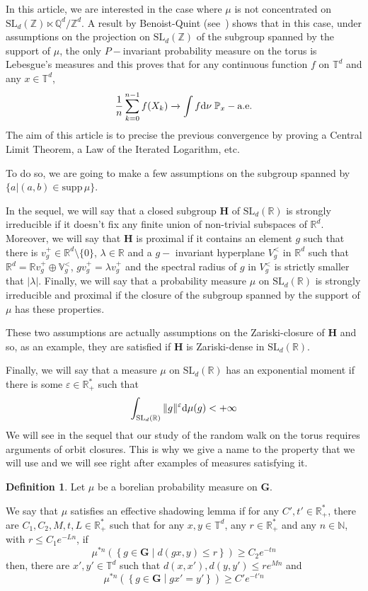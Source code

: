 \documentclass[11pt]{amsart}
\theoremstyle{definition}
\newtheorem{definition}[theorem]{Definition}
\theoremstyle{remark}
\numberwithin{equation}{section}
\begin{document}
\medskip
In this article, we are interested in the case where $\mu$ is not concentrated on $\mathrm{SL}_d({\mathbb Z})\ltimes {\mathbb Q}^d/{\mathbb Z}^d$. A result by Benoist-Quint (see~\cite{BQStat0}) shows that in this case, under assumptions on the projection on $\mathrm{SL}_d({\mathbb Z})$ of the subgroup spanned by the support of $\mu$, the only $P-$invariant probability measure on the torus is Lebesgue's measures and this proves that for any continuous function $f$ on ${\mathbb T}^d$ and any $x\in {\mathbb T}^d$,
\[
\frac 1 n \sum_{k=0}^{n-1} f(X_k) \xrightarrow\, \int f{{\rm d}}\nu \;{\mathbb P}_x-\text{a.e.}
\]
The aim of this article is to precise the previous convergence by proving a Central Limit Theorem, a Law of the Iterated Logarithm, etc.

To do so, we are going to make a few assumptions on the subgroup spanned by $\{a|(a,b)\in{\mathrm{supp}\,}\mu\}$.

In the sequel, we will say that a closed subgroup ${\mathbf H}$ of $\mathrm{SL}_d({\mathbb R})$ is strongly irreducible if it doesn't fix any finite union of non-trivial subspaces of ${\mathbb R}^d$. Moreover, we will say that ${\mathbf H}$ is proximal if it contains an element $g$ such that there is $v_g^+ \in {\mathbb R}^d\setminus\{0\}$, $\lambda \in {\mathbb R}$ and a $g-$
invariant hyperplane $V_g^<$ in ${\mathbb R}^d$ such that ${\mathbb R}^d=  {\mathbb R} v_g^+ \oplus {\mathbb V}_g^<$, $gv_g^+ = \lambda v_g^+$ and the spectral radius of $g$ in $V_g^<$ is strictly smaller that $|\lambda|$. Finally, we will say that a probability measure $\mu$ on $\mathrm{SL}_d({\mathbb R})$ is strongly irreducible and proximal if the closure of the subgroup spanned by the support of $\mu$ has these properties.

These two assumptions are actually assumptions on the Zariski-closure of ${\mathbf H}$ and so, as an example, they are satisfied if ${\mathbf H}$ is Zariski-dense in $\mathrm{SL}_d({\mathbb R})$.

Finally, we will say that a measure $\mu$ on $\mathrm{SL}_d({\mathbb R})$ has an exponential moment if there is some $\varepsilon\in {\mathbb R}_+^\ast$ such that
\[
\int_{\mathrm{SL}_d({\mathbb R})} \|g\|^\varepsilon {{\rm d}}\mu(g)<+\infty
\]
We will see in the sequel that our study of the random walk on the torus requires arguments of orbit closures. This is why we give a name to the property that we will use and we will see right after examples of measures satisfying it.
\begin{definition}
Let $\mu$ be a borelian probability measure on ${\mathbf G}$.

We say that $\mu$ satisfies an effective shadowing lemma if for any $C',t' \in {\mathbb R}_+^\ast$, there are $C_1,C_2,M,t,L \in {\mathbb R}_+^\ast$ such that for any $x,y\in {\mathbb T}^d$, any $r\in {\mathbb R}_+^\ast$ and any $n\in {\mathbb N}$, with $r\leqslant C_1e^{-Ln}$, if
\[
\mu^{\ast n} \left(\left\{ g\in {\mathbf G}\middle| d(gx,y) \leqslant r \right\}\right) \geqslant C_2 e^{-t n}
\]
then, there are $x',y'\in {\mathbb T}^d$ such that $d(x,x'),d(y,y')\leqslant re^{Mn}$ and
\[
\mu^{\ast n} \left(\left\{ g\in {\mathbf G}\middle| gx'=y'\right\}\right)\geqslant C'e^{-t'n}
\]
\end{definition}
\end{document}
